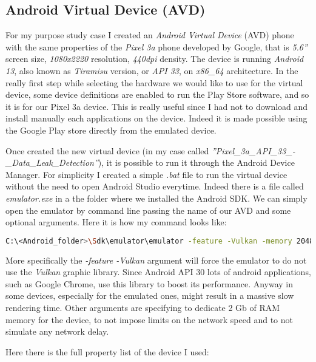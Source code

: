 		\subsection{Android Virtual Device (AVD)}
			For my purpose study case I created an \textit{Android Virtual Device} (AVD) phone with the same properties of the \textit{Pixel 3a} phone developed by Google, that is \textit{5.6''} screen size, \textit{1080x2220} resolution, \textit{440dpi} density. The device is running \textit{Android 13}, also known as \textit{Tiramisu} version, or \textit{API 33}, on \textit{x86\_64} architecture. In the really first step while selecting the hardware we would like to use for the virtual device, some device definitions are enabled to run the Play Store software, and so it is for our Pixel 3a device. This is really useful since I had not to download and install manually each applications on the device. Indeed it is made possible using the Google Play store directly from the emulated device. 
			\par Once created the new virtual device (in my case called \textit{''Pixel\_3a\_API\_33\_-\_Data\_Leak\_Detection''}), it is possible to run it through the Android Device Manager. For simplicity I created a simple \textit{.bat} file to run the virtual device without the need to open Android Studio everytime. Indeed there is a file called \textit{emulator.exe} in a the folder where we installed the Android SDK. We can simply open the emulator by command line passing the name of our AVD and some optional arguments. Here it is how my command looks like:
\begin{lstlisting}[language=bash, caption={run\_AVD.bat}]
C:\<Android_folder>\Sdk\emulator\emulator -feature -Vulkan -memory 2048 -netdelay none -netspeed full -avd Pixel_3a_API_33_-_Data_Leak_Detection
\end{lstlisting}
		\par More specifically the \textit{-feature -Vulkan} argument will force the emulator to do not use the \textit{Vulkan} graphic library. Since Android API 30 lots of android applications, such as Google Chrome, use this library to boost its performance. Anyway in some devices, especially for the emulated ones, might result in a massive slow rendering time. Other arguments are specifying to dedicate 2 Gb of RAM memory for the device, to not impose limits on the network speed and to not simulate any network delay.
			\par Here there is the full property list of the device I used:
